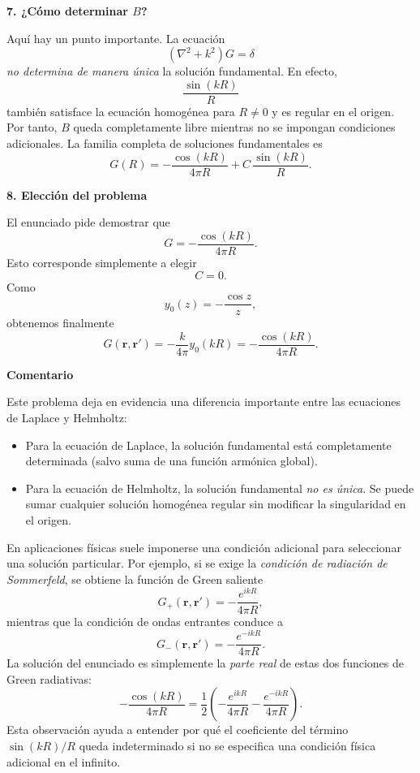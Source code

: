 \documentclass[11pt,spanish]{article}
\newcounter{problema}
\begin{document}
{\bf 7. ¿Cómo determinar $B$?}

Aquí hay un punto importante.
La ecuación
$$
(\nabla^2+k^2)G=\delta
$$
{\em no determina de manera única} la solución fundamental.
En efecto,
$$
\frac{\sin(kR)}R
$$
también satisface la ecuación homogénea para $R\neq0$ y es regular en el origen.
Por tanto, $B$ queda completamente libre mientras no se impongan condiciones adicionales.
La familia completa de soluciones fundamentales es
$$
\boxed{
G(R)
=
-\frac{\cos(kR)}{4\pi R}
+
C\,\frac{\sin(kR)}R.
}
$$

{\bf 8. Elección del problema}

El enunciado pide demostrar que
$$
G
=
-\frac{\cos(kR)}{4\pi R}.
$$
Esto corresponde simplemente a elegir
$$
C=0.
$$
Como
$$
y_0(z)
=
-\frac{\cos z}{z},
$$
obtenemos finalmente
$$
\boxed{
G(\mathbf r,\mathbf r')
=
-\frac{k}{4\pi}
y_0(kR)
=
-\frac{\cos(kR)}
{4\pi R}.
}
$$

{\bf Comentario}

Este problema deja en evidencia una diferencia importante entre las ecuaciones de Laplace y Helmholtz:
\begin{itemize}
\item Para la ecuación de Laplace, la solución fundamental está completamente determinada (salvo suma de una función armónica global).
\item Para la ecuación de Helmholtz, la solución fundamental {\em no es única}. Se puede sumar cualquier solución homogénea regular sin modificar la singularidad en el origen.
\end{itemize}
En aplicaciones físicas suele imponerse una condición adicional para seleccionar una solución particular. Por ejemplo, si se exige la {\em condición de radiación de Sommerfeld}, se obtiene la función de Green saliente
$$
\boxed{
G_+(\mathbf r,\mathbf r')
=
-\frac{e^{ikR}}{4\pi R},
}
$$
mientras que la condición de ondas entrantes conduce a
$$
\boxed{
G_-(\mathbf r,\mathbf r')
=
-\frac{e^{-ikR}}{4\pi R}.
}
$$
La solución del enunciado es simplemente la {\em parte real} de estas dos funciones de Green radiativas:
$$
-\frac{\cos(kR)}{4\pi R}
=
\frac12\left(
-\frac{e^{ikR}}{4\pi R}
-
\frac{e^{-ikR}}{4\pi R}
\right).
$$
Esta observación ayuda a entender por qué el coeficiente del término $\sin(kR)/R$ queda indeterminado si no se especifica una condición física adicional en el infinito.
\end{document}
